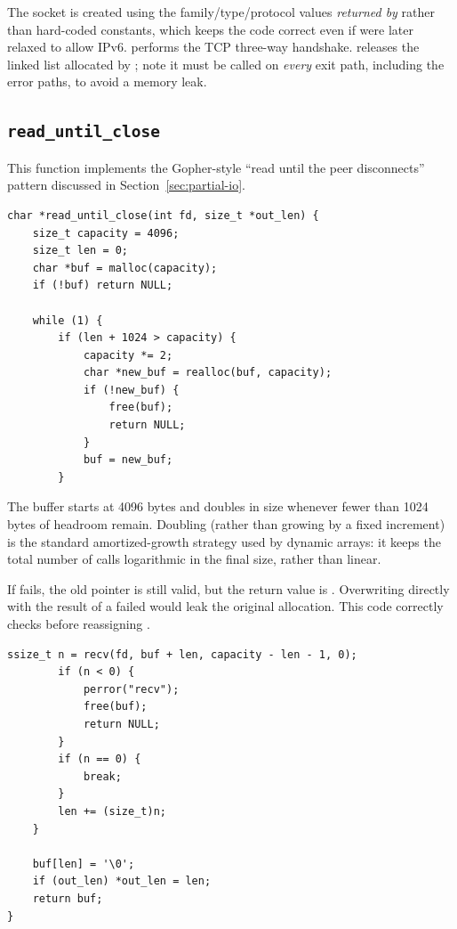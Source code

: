 The socket is created using the family/type/protocol values \emph{returned by}  rather than hard-coded constants, which keeps the code correct even if  were later relaxed to allow IPv6.  performs the TCP three-way handshake.  releases the linked list allocated by ; note it must be called on \emph{every} exit path, including the error paths, to avoid a memory leak.

\subsection{\texttt{read\_until\_close}}

This function implements the Gopher-style ``read until the peer disconnects'' pattern discussed in Section~\ref{sec:partial-io}.

\begin{lstlisting}[style=cstyle]
char *read_until_close(int fd, size_t *out_len) {
    size_t capacity = 4096;
    size_t len = 0;
    char *buf = malloc(capacity);
    if (!buf) return NULL;

    while (1) {
        if (len + 1024 > capacity) {
            capacity *= 2;
            char *new_buf = realloc(buf, capacity);
            if (!new_buf) {
                free(buf);
                return NULL;
            }
            buf = new_buf;
        }
\end{lstlisting}

The buffer starts at 4096 bytes and doubles in size whenever fewer than 1024 bytes of headroom remain. Doubling (rather than growing by a fixed increment) is the standard amortized-growth strategy used by dynamic arrays: it keeps the total number of  calls logarithmic in the final size, rather than linear.

\begin{warnbox}
If  fails, the old  pointer is still valid, but the return value  is . Overwriting  directly with the result of a failed  would leak the original allocation. This code correctly checks  before reassigning .
\end{warnbox}

\begin{lstlisting}[style=cstyle]
        ssize_t n = recv(fd, buf + len, capacity - len - 1, 0);
        if (n < 0) {
            perror("recv");
            free(buf);
            return NULL;
        }
        if (n == 0) {
            break;
        }
        len += (size_t)n;
    }

    buf[len] = '\0';
    if (out_len) *out_len = len;
    return buf;
}
\end{lstlisting}

